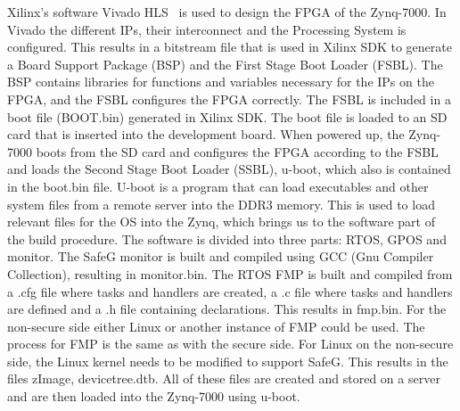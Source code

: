 Xilinx's software Vivado HLS~\cite{website:vivado} is used to design the FPGA of the Zynq-7000. In Vivado the different IPs, their interconnect and the Processing System is configured. This results in a bitstream file that is used in Xilinx SDK to generate a Board Support Package (BSP) and the First Stage Boot Loader (FSBL). The BSP contains libraries for functions and variables necessary for the IPs on the FPGA, and the FSBL configures the FPGA correctly. The FSBL is included in a boot file (BOOT.bin) generated in Xilinx SDK. The boot file is loaded to an SD card that is inserted into the development board. When powered up, the Zynq-7000 boots from the SD card and configures the FPGA according to the FSBL and loads the Second Stage Boot Loader (SSBL), u-boot, which also is contained in the boot.bin file. U-boot is a program that can load executables and other system files from a remote server into the DDR3 memory. This is used to load relevant files for the OS into the Zynq, which brings us to the software part of the build procedure. The software is divided into three parts: RTOS, GPOS and monitor. The SafeG monitor is built and compiled using GCC (Gnu Compiler Collection), resulting in monitor.bin. The RTOS FMP is built and compiled from a .cfg file where tasks and handlers are created, a .c file where tasks and handlers are defined and a .h file containing declarations. This results in fmp.bin. For the non-secure side either Linux or another instance of FMP could be used. The process for FMP is the same as with the secure side. For Linux on the non-secure side, the Linux kernel needs to be modified to support SafeG. This results in the files zImage, devicetree.dtb. All of these files are created and stored on a server and are then loaded into the Zynq-7000 using u-boot.\\


